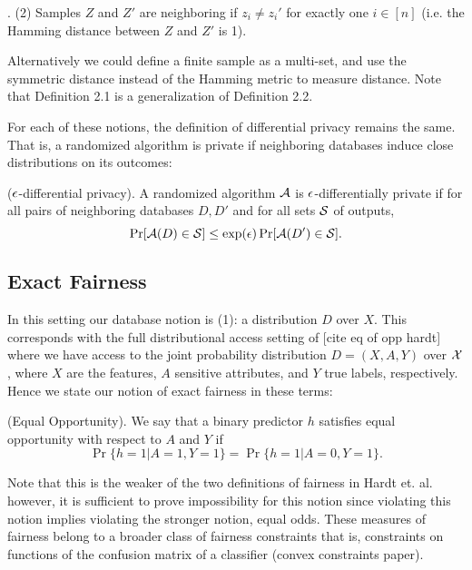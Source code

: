 \begin{defn} .
  (2) Samples $Z$ and $Z'$ are neighboring if $z_i \neq z_i'$ for
  exactly one $i \in [n]$ (i.e. the Hamming distance between $Z$ and
  $Z'$ is 1).
\end{defn}
Alternatively we could define a finite sample as a multi-set, and use
the symmetric distance instead of the Hamming metric to measure
distance. Note that Definition 2.1 is a generalization of Definition
2.2.

For each of these notions, the definition of differential privacy
remains the same. That is, a randomized algorithm is private if
neighboring databases induce close distributions on its outcomes:

\begin{defn}
  ($\eps$-differential privacy).  A randomized algorithm
    $\A$ is $\eps$-differentially private if for all pairs of
    neighboring databases $D,D'$ and for all sets $\S$ of outputs,
    $$\Pr[\A(D)\in \S] \leq \exp(\eps)\Pr[\A(D')\in \S].$$
\end{defn}


\subsection{Exact Fairness}

In this setting our database notion is (1): a distribution $D$ over
$X$. This corresponds with the full distributional access setting of
[cite eq of opp hardt] where we have access to the joint probability
distribution $D = (X, A, Y)$ over $\X$, where $X$ are the features, $A$
sensitive attributes, and $Y$ true labels, respectively. Hence we state
our notion of exact fairness in these terms:

\begin{defn}
  (Equal Opportunity). We say that a binary predictor $h$ satisfies
    equal opportunity with respect to $A$ and $Y$ if
    $$\Pr\{h = 1 | A =1, Y=1\} = \Pr\{h = 1 | A=0, Y=1\}.$$
\end{defn}

Note that this is the weaker of the two definitions of fairness in
Hardt et. al. however, it is sufficient to prove impossibility for this
notion since violating this notion implies violating the stronger
notion, equal odds. These measures of fairness belong to a broader
class of fairness constraints that is, constraints on functions of the
confusion matrix of a classifier (convex constraints paper).

